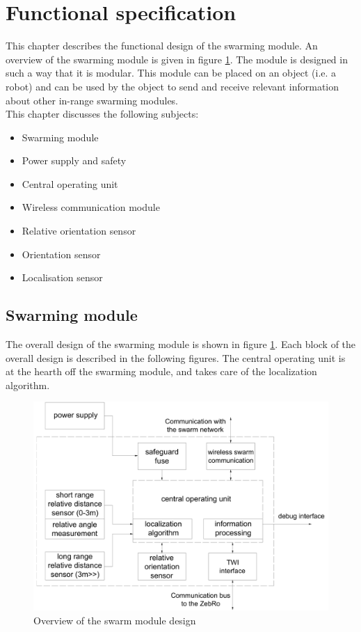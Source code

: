 \documentclass[10pt,a4paper]{article}
\begin{document}
\section{Functional specification}
This chapter describes the functional design of the swarming module. An overview of the swarming module is given in figure \ref{overall}. The module is designed in such a way that it is modular. This module can be placed on an object (i.e. a robot) and can be used by the object to send and receive relevant information about other in-range swarming modules.\\

This chapter discusses the following subjects:
\begin{itemize}
\setlength\itemsep{0em}
\item Swarming module
\item Power supply and safety
\item Central operating unit
\item Wireless communication module
\item Relative orientation sensor
\item Orientation sensor
\item Localisation sensor
\end{itemize}

\subsection{Swarming module}
The overall design of the swarming module is shown in figure \ref{overall}. Each block of the overall design is described in the following figures. The central operating unit is at the hearth off the swarming module, and takes care of the localization algorithm.
\begin{figure}[h]
  \centering
      \includegraphics[width=1\textwidth]{overall.pdf}
  \caption{Overview of the swarm module design}
  \label{overall}
\end{figure}
\end{document}
